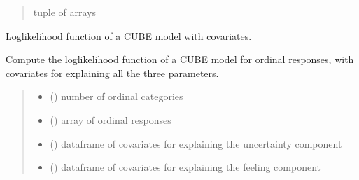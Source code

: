 \documentclass[letterpaper,10pt,english]{sphinxmanual}
\begin{document}
\begin{fulllineitems}
\begin{quote}
\begin{description}
\sphinxAtStartPar
tuple of arrays

\end{description}\end{quote}

\end{fulllineitems}


\begin{fulllineitems}
\label{\detokenize{cubmods:cubmods.cube_ywz.loglik}}
\pysigstartsignatures
{}
\pysigstopsignatures
\sphinxAtStartPar
Log\sphinxhyphen{}likelihood function of a CUBE model with covariates.

\sphinxAtStartPar
Compute the log\sphinxhyphen{}likelihood function of a CUBE model for ordinal responses,
with covariates for explaining all the three parameters.
\begin{quote}\begin{description}
\begin{itemize}
\item {} 
\sphinxAtStartPar
{} () \textendash{} number of ordinal categories

\item {} 
\sphinxAtStartPar
{} () \textendash{} array of ordinal responses

\item {} 
\sphinxAtStartPar
{} () \textendash{} dataframe of covariates for explaining the uncertainty component

\item {} 
\sphinxAtStartPar
{} () \textendash{} dataframe of covariates for explaining the feeling component


\end{itemize}
\end{description}
\end{quote}
\end{fulllineitems}
\end{document}
